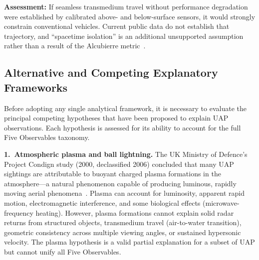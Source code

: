 \documentclass[aps,prd,twocolumn,superscriptaddress,nofootinbib,floatfix]{revtex4-2}
\begin{document}
\textbf{Assessment:} If seamless transmedium travel without performance
degradation were established by calibrated above- and below-surface sensors, it
would strongly constrain conventional vehicles. Current public data do not
establish that trajectory, and ``spacetime isolation'' is an additional
unsupported assumption rather than a result of the Alcubierre
metric~\cite{Alcubierre1994}.

\subsection{Alternative and Competing Explanatory Frameworks}\label{sec:alternatives}

Before adopting any single analytical framework, it is necessary to evaluate the
principal competing hypotheses that have been proposed to explain UAP
observations. Each hypothesis is assessed for its ability to account for the full
Five Observables taxonomy.

\textbf{1.\ Atmospheric plasma and ball lightning.} The UK Ministry of Defence's
Project Condign study (2000, declassified 2006) concluded that many UAP sightings
are attributable to buoyant charged plasma formations in the atmosphere---a
natural phenomenon capable of producing luminous, rapidly moving aerial
phenomena~\cite{Condign2000}. Plasma can account for luminosity, apparent rapid
motion, electromagnetic interference, and some biological effects
(microwave-frequency heating). However, plasma formations cannot explain solid
radar returns from structured objects, transmedium travel (air-to-water
transition), geometric consistency across multiple viewing angles, or sustained
hypersonic velocity. The plasma hypothesis is a valid partial explanation for a
subset of UAP but cannot unify all Five Observables.
\end{document}
